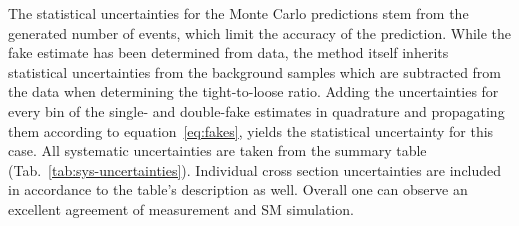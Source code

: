 The statistical uncertainties for the Monte Carlo predictions stem from the generated number of events, which limit the accuracy of the prediction. While the fake estimate has been determined from data, the method itself inherits  statistical uncertainties from the background samples which are subtracted from the data when determining the tight-to-loose ratio. Adding the uncertainties for every bin of the single- and double-fake estimates in quadrature and propagating them according to equation~\eqref{eq:fakes}, yields the statistical uncertainty for this case. All systematic uncertainties are taken from the summary table (Tab.~\ref{tab:sys-uncertainties}). Individual cross section uncertainties are included in accordance to the table's description as well. Overall one can observe an excellent agreement of measurement and SM simulation.

